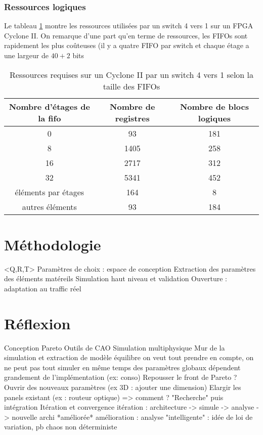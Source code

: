 \documentclass[11pt]{article}
\begin{document}
\subsubsection{Ressources logiques}
Le tableau \ref{perfs-sw-4} montre les ressources utilisées par un switch 4 vers 1 sur un FPGA Cyclone II. On remarque d'une part qu'en terme de ressources, les FIFOs sont rapidement les plus coûteuses (il y a quatre FIFO par switch et chaque étage a une largeur de $40+2$ bits

\begin{table}
\centering
\begin{tabular}{|c|c|c|}
\hline
Nombre d'étages de la fifo & Nombre de registres & Nombre de blocs logiques \\
\hline
0 & 93 & 181 \\
8 & 1405 & 258 \\
16 &  2717 & 312 \\
32 & 5341 & 452 \\
\hline \hline
éléments par étages & 164 & 8 \\
autres éléments & 93 & 184 \\
\hline
\end{tabular}
\caption{Ressources requises sur un Cyclone II par un switch 4 vers 1 selon la taille des FIFOs}
\label{perfs-sw-4}
\end{table}

\section{Méthodologie}
	<Q,R,T>
	Paramètres de choix : espace de conception
	Extraction des paramètres des éléments matéreils
	Simulation haut niveau et validation
	Ouverture : adaptation au traffic réel

\section{Réflexion}
	Conception
	Pareto
	Outils de CAO
	Simulation multiphysique
	Mur de la simulation et extraction de modèle
		équilibre on veut tout prendre en compte, on ne peut pas tout simuler en même temps
		des paramètres globaux dépendent grandement de l'implémentation (ex: conso)
	Repousser le front de Pareto ?
		Ouvrir des nouveaux paramètres (ex 3D : ajouter une dimension)
		Elargir les panels existant (ex : routeur optique)
		=> comment ? "Recherche" puis intégration
	Itération et convergence
		itération : architecture -> simule -> analyse -> nouvelle archi *améliorée*
		amélioration : analyse "intelligente" : idée de loi de variation, pb chaos non déterministe
\end{document}
